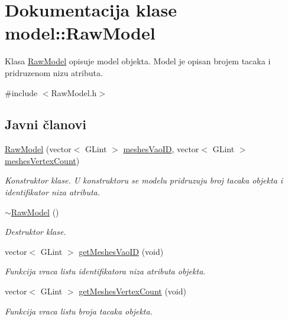 \hypertarget{classmodel_1_1RawModel}{}\section{Dokumentacija klase model\+:\+:Raw\+Model}
\label{classmodel_1_1RawModel}


Klasa \hyperlink{classmodel_1_1RawModel}{Raw\+Model} opisuje model objekta. Model je opisan brojem tacaka i pridruzenom nizu atributa.  




{\ttfamily \#include $<$Raw\+Model.\+h$>$}

\subsection*{Javni članovi}
\begin{DoxyCompactItemize}
\item 
\hyperlink{classmodel_1_1RawModel_ab1f77c2fa73575a79b65bae30cec98a6}{Raw\+Model} (vector$<$ G\+Lint $>$ \hyperlink{classmodel_1_1RawModel_a994176411e71716620d422dd56febbac}{meshes\+Vao\+ID}, vector$<$ G\+Lint $>$ \hyperlink{classmodel_1_1RawModel_a9a6ad9eb37bd6453ec115c2195d7f8a2}{meshes\+Vertex\+Count})
\begin{DoxyCompactList}\small\item\em Konstruktor klase. U konstruktoru se modelu pridruzuju broj tacaka objekta i identifikator niza atributa. \end{DoxyCompactList}\item 
\hyperlink{classmodel_1_1RawModel_a44e687484478b0747abe25baa3533b71}{$\sim$\+Raw\+Model} ()
\begin{DoxyCompactList}\small\item\em Destruktor klase. \end{DoxyCompactList}\item 
vector$<$ G\+Lint $>$ \hyperlink{classmodel_1_1RawModel_af13c9200466649ab5900eaeeeeefdbc4}{get\+Meshes\+Vao\+ID} (void)
\begin{DoxyCompactList}\small\item\em Funkcija vraca listu identifikatora niza atributa objekta. \end{DoxyCompactList}\item 
vector$<$ G\+Lint $>$ \hyperlink{classmodel_1_1RawModel_aafc5e5b7da34dda1c80cff89a65d08e5}{get\+Meshes\+Vertex\+Count} (void)
\begin{DoxyCompactList}\small\item\em Funkcija vraca listu broja tacaka objekta. \end{DoxyCompactList}\end{DoxyCompactItemize}
